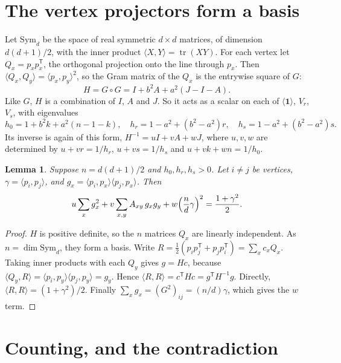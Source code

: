 \documentclass[11pt]{article}
\newtheorem{lemma}{Lemma}
\newcommand{\Sym}{\mathrm{Sym}}
\newcommand{\one}{\mathbf 1}
\begin{document}
\section{The vertex projectors form a basis}

Let $\Sym_d$ be the space of real symmetric $d\times d$ matrices, of dimension $d(d+1)/2$, with the inner product
$\langle X,Y\rangle=\operatorname{tr}(XY)$. For each vertex let $Q_x=p_xp_x^{\mathsf T}$, the orthogonal projection onto
the line through $p_x$. Then $\langle Q_x,Q_y\rangle=\langle p_x,p_y\rangle^2$, so the Gram matrix of the $Q_x$ is the
entrywise square of $G$:
\[ H=G\circ G=I+b^2A+a^2(J-I-A). \]
Like $G$, $H$ is a combination of $I$, $A$ and $J$. So it acts as a scalar on each of $\langle\one\rangle$, $V_r$, $V_s$,
with eigenvalues
\[ h_0=1+b^2k+a^2(n-1-k),\quad h_r=1-a^2+(b^2-a^2)r,\quad h_s=1-a^2+(b^2-a^2)s. \]
Its inverse is again of this form, $H^{-1}=uI+vA+wJ$, where $u,v,w$ are determined by $u+vr=1/h_r$, $u+vs=1/h_s$ and
$u+vk+wn=1/h_0$.

\begin{lemma}\label{lem}
Suppose $n=d(d+1)/2$ and $h_0,h_r,h_s>0$. Let $i\ne j$ be vertices, $\gamma=\langle p_i,p_j\rangle$, and
$g_x=\langle p_i,p_x\rangle\langle p_j,p_x\rangle$. Then
\[ u\sum_xg_x^2+v\sum_{x,y}A_{xy}\,g_xg_y+w\Bigl(\frac nd\gamma\Bigr)^2=\frac{1+\gamma^2}2. \]
\end{lemma}

\begin{proof}
$H$ is positive definite, so the $n$ matrices $Q_x$ are linearly independent. As $n=\dim\Sym_d$, they form a basis.
Write $R=\frac12(p_ip_j^{\mathsf T}+p_jp_i^{\mathsf T})=\sum_xc_xQ_x$. Taking inner products with each $Q_y$ gives
$g=Hc$, because $\langle Q_y,R\rangle=\langle p_i,p_y\rangle\langle p_j,p_y\rangle=g_y$. Hence
$\langle R,R\rangle=c^{\mathsf T}Hc=g^{\mathsf T}H^{-1}g$. Directly, $\langle R,R\rangle=(1+\gamma^2)/2$. Finally
$\sum_xg_x=(G^2)_{ij}=(n/d)\gamma$, which gives the $w$ term.
\end{proof}

\section{Counting, and the contradiction}
\end{document}
